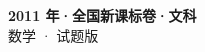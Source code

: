\documentclass[zihao=-4, a4paper]{ctexart}
\begin{document}
\begin{center}
  {\Large\bfseries 2011 年·全国新课标卷·文科}\\[4pt]
  {\large 数学 · 试题版}
\end{center}
\medskip
{}

\end{document}
